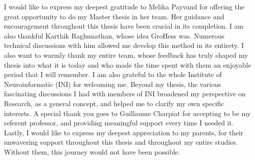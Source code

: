 \documentclass[11pt]{article}
\begin{document}
I would like to express my deepest gratitude to Melika Payvand for offering the great opportunity to do my Master thesis in her team. Her guidance and encouragement throughout this thesis have been crucial in its completion. I am also thankful Karthik Raghunathan, whose idea GroHess was. Numerous technical discussions with him allowed me develop this method in its entirety. I also want to warmly thank my entire team, whose feedback has truly shaped my thesis into what it is today and who made the time spent with them an enjoyable period that I will remember. I am also grateful to the whole Institute of Neuroinformatic (INI) for welcoming me. Beyond my thesis, the various fascinating discussions I had with members of INI broadened my perspective on Research, as a general concept, and helped me to clarify my own specific interests. A special thank you goes to Guillaume Charpiat for accepting to be my referent professor, and providing meaningful support every time I needed it. Lastly, I would like to express my deepest appreciation to my parents, for their unwavering support throughout this thesis and throughout my entire studies. Without them, this journey would not have been possible.



\printbibliography
\end{document}
